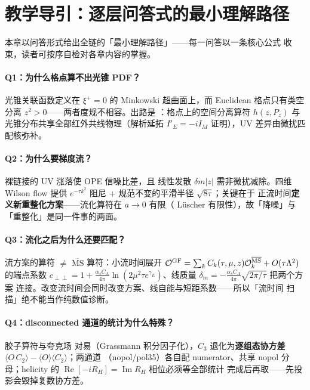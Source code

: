 \documentclass[11pt,a4paper]{ctexart}
\newcommand{\LaMET}{\text{LaMET}}
\newcommand{\MSbarM}{\overline{\text{MS}}}
\newcommand{\abs}[1]{\lvert #1\rvert}
\begin{document}
\section{教学导引：逐层问答式的最小理解路径}
\label{sec:tutorial}

本章以问答形式给出全链的「最小理解路径」——每一问答以一条核心公式
收束，读者可按序自检对各章内容的掌握。

\paragraph{Q1：为什么格点算不出光锥 PDF？}光锥关联函数定义在
$\xi^+=0$ 的 Minkowski 超曲面上，而 Euclidean 格点只有类空分离
$z^2>0$——两者度规不相容。出路是 \LaMET：格点上的空间分离算符
$h(z,P_z)$ 与光锥分布共享全部红外共线物理（解析延拓
$I'_E=-iI_M$ 证明），UV 差异由微扰匹配核弥补。

\paragraph{Q2：为什么要梯度流？}裸链接的 UV 涨落使 OPE 信噪比差，且
线性发散 $\delta m\abs z$ 需非微扰减除。四维 Wilson flow 提供
$e^{-\tau k^2}$ 阻尼 + 规范不变的平滑半径 $\sqrt{8\tau}$；关键在于
正流时间\textbf{定义新重整化方案}——流化算符在 $a\to0$ 有限（
L\"uscher 有限性），故「降噪」与「重整化」是同一件事的两面。

\paragraph{Q3：流化之后为什么还要匹配？}流方案的算符 $\ne$
$\MSbarM$ 算符：小流时间展开
$\mathcal O^{\rm GF}=\sum_k C_k(\tau,\mu,z)\mathcal O_k^{\MSbarM}
+O(\tau\Lambda^2)$ 的端点系数
$c_{\perp\perp}=1+\frac{\alpha_sC_A}{4\pi}
\ln(2\mu^2\tau e^{\gamma_E})$、线质量
$\delta_m=-\frac{\alpha_sC_A}{4\pi}\sqrt{2\pi/\tau}$ 把两个方案
连接。改变流时间会同时改变方案、线自能与短距系数——所以「流时间
扫描」绝不能当作纯数值诊断。

\paragraph{Q4：disconnected 通道的统计为什么特殊？}胶子算符与夸克场
对易（Grassmann 积分因子化），$C_3$ 退化为\textbf{逐组态协方差}
$\langle O\,C_2\rangle-\langle O\rangle\langle C_2\rangle$；两通道
（nopol/pol35）各自配 numerator、共享 nopol 分母；helicity 的
$\operatorname{Re}[-iR_H]=\operatorname{Im}R_H$ 相位必须等全部统计
完成后再取——先投影会毁掉复数协方差。
\end{document}
